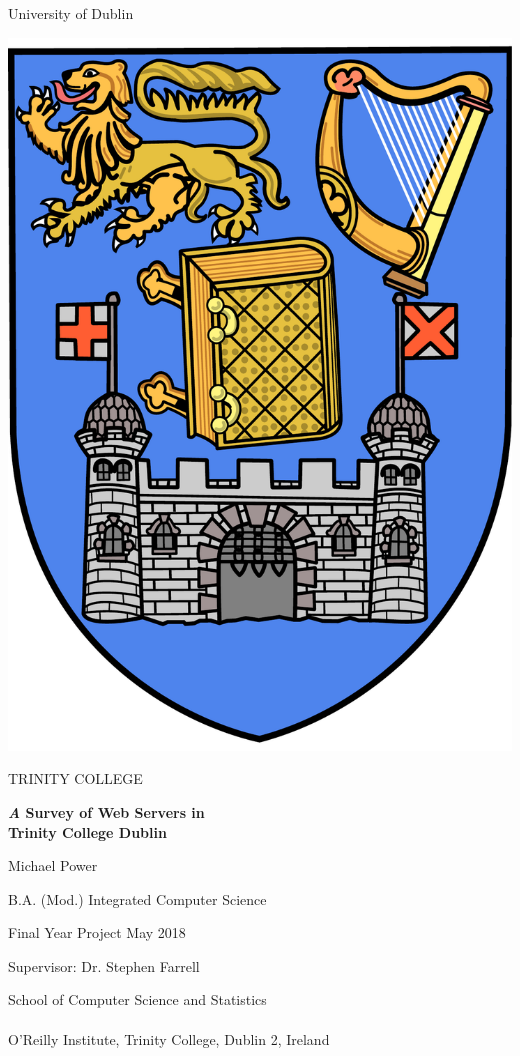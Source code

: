 \documentclass[a4wide,leqno,12pt]{report}
\begin{document}
\sloppy
\bgroup %
\linespread{0}
\thispagestyle{empty}
\begin{center}
{\sffamily
{\Large University of Dublin}

\vspace{10pt}

\includegraphics[scale=0.12]{images/trinitycollege.pdf}

\vspace{10pt}

{\Huge TRINITY COLLEGE}

\vspace{80pt}

\textbf{ \Large \emph A Survey of Web Servers in\\ Trinity College Dublin}

\vspace{30pt}

Michael Power

B.A. (Mod.) Integrated Computer Science

Final Year Project May 2018

Supervisor: Dr. Stephen Farrell

\vspace{110pt}

\large{School of Computer Science and Statistics
\\$ $\\
O'Reilly Institute, Trinity College, Dublin 2, Ireland}
\linespread{1}
}
\end{center}
\egroup %
\end{document}
